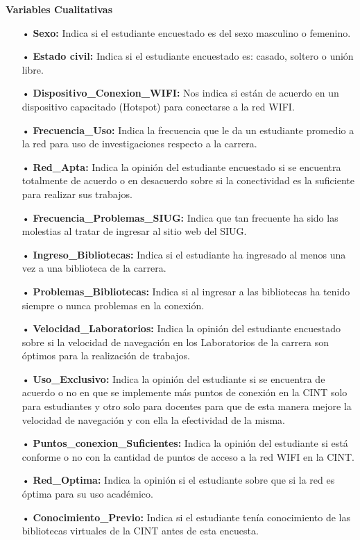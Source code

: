 \documentclass[12pt, a4paper, nofontenc, numbers=endperiod]{apa7}
\begin{document}
{\begin{itemize}
\end{itemize}
\textbf{Variables Cualitativas}
\begin{itemize}
	\item[•]\textbf{Sexo:} Indica si el estudiante encuestado es del sexo masculino o femenino.
	\item[•] \textbf{Estado civil:} Indica si el estudiante encuestado es: casado, soltero o unión libre.
	\item[•] \textbf{Dispositivo\_Conexion\_WIFI:} Nos indica si están de acuerdo en un dispositivo capacitado (Hotspot) para conectarse a la red WIFI.
	\item[•] \textbf{Frecuencia\_Uso:} Indica la frecuencia que le da un estudiante promedio a la red para uso de investigaciones respecto a la carrera.
	\item[•] \textbf{Red\_Apta:} Indica la opinión del estudiante encuestado si se encuentra totalmente de acuerdo o en desacuerdo sobre si la conectividad es la suficiente para realizar sus trabajos.
	\item[•] \textbf{Frecuencia\_Problemas\_SIUG:} Indica que tan frecuente ha sido las molestias al tratar de ingresar al sitio web del SIUG.
	\item[•] \textbf{Ingreso\_Bibliotecas:} Indica si el estudiante ha ingresado al menos una vez a una biblioteca de la carrera.
	\item[•] \textbf{Problemas\_Bibliotecas:} Indica si al ingresar a las bibliotecas ha tenido siempre o nunca problemas en la conexión.
	\item[•] \textbf{Velocidad\_Laboratorios:} Indica la opinión del estudiante encuestado sobre si la velocidad de navegación en los Laboratorios de la carrera son óptimos para la realización de trabajos.
	\item[•] \textbf{Uso\_Exclusivo:} Indica la opinión del estudiante si se encuentra de acuerdo o no en que se implemente más puntos de conexión en la CINT solo para estudiantes y otro solo para docentes para que de esta manera mejore la velocidad de navegación y con ella la efectividad de la misma.
	\item[•] \textbf{Puntos\_conexion\_Suficientes:} Indica la opinión del estudiante si está conforme o no con la cantidad de puntos de acceso a la red WIFI en la CINT.
	\item[•] \textbf{Red\_Optima:} Indica la opinión si el estudiante sobre que si la red es óptima para su uso académico.
	\item[•] \textbf{Conocimiento\_Previo:} Indica si el estudiante tenía conocimiento de las bibliotecas virtuales de la CINT antes de esta encuesta.

\end{itemize}}
\end{document}
